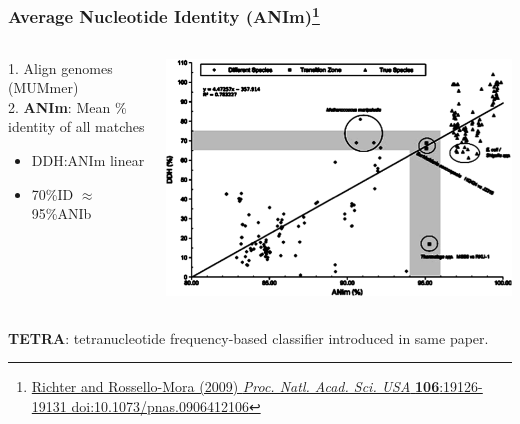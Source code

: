 \begin{frame}
  \frametitle{Average Nucleotide Identity (ANIm)\footnote{\tiny{\href{http://dx.doi.org/10.1073/pnas.0906412106}{Richter and Rossello-Mora (2009) \textit{Proc. Natl. Acad. Sci. USA} \textbf{106}:19126-19131 doi:10.1073/pnas.0906412106}}}}
  \begin{columns}[T]
    \begin{column}{3cm}
      1. Align genomes (MUMmer)\\
      2. \textbf{ANIm}: Mean \% identity of all matches\\[0.25cm]
      \begin{itemize}
        \item DDH:ANIm linear
        \item 70\%ID $\approx$ 95\%ANIb
      \end{itemize}
    \end{column}
    \begin{column}{7cm}
      \includegraphics[width=1\textwidth]{images/ddh_anim}
    \end{column}
  \end{columns}
  \textbf{TETRA}: tetranucleotide frequency-based classifier introduced in same paper.
\end{frame}

